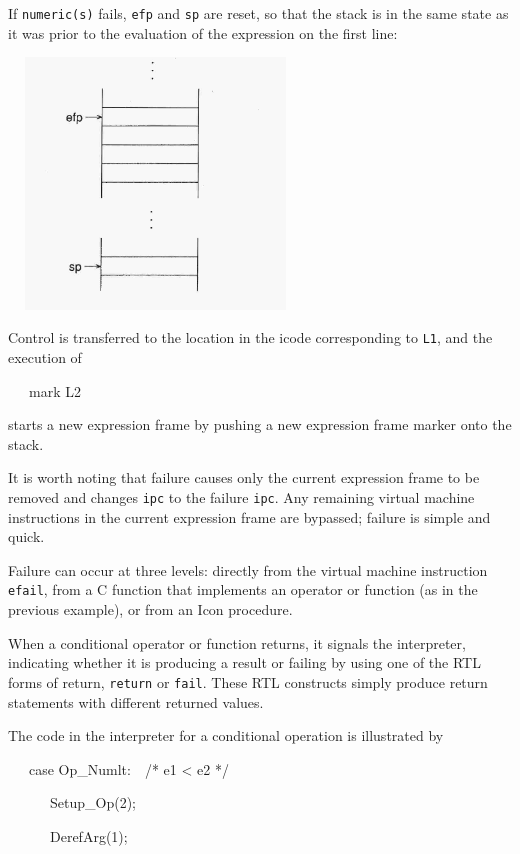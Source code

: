 If \texttt{numeric(s)} fails, \texttt{efp} and \texttt{sp} are reset,
so that the stack is in the same state as it was prior to the
evaluation of the expression on the first line:

\ \  \includegraphics[width=2.778in,height=2.6311in]{ib-img/ib-img065.jpg} 

Control is transferred to the location in the icode corresponding to
\texttt{L1}, and the execution of

{\ttfamily\mdseries
\ \ \ mark L2}

\noindent starts a new expression frame by pushing a new expression
frame marker onto the stack.

It is worth noting that failure causes only the current expression
frame to be removed and changes \texttt{ipc} to the failure
\texttt{ipc}. Any remaining virtual machine instructions in the
current expression frame are bypassed; failure is simple and quick.

Failure can occur at three levels: directly from the virtual machine
instruction \texttt{efail}, from a C function that implements an
operator or function (as in the previous example), or from an Icon
procedure.


When a conditional operator or function returns, it signals the
interpreter, indicating whether it is producing a result or failing by
using one of the RTL forms of return, \texttt{return} or
\texttt{fail}. These RTL constructs simply produce return statements
with different returned values.

The code in the interpreter for a conditional operation is illustrated by

{\ttfamily\mdseries
\ \ \ case Op\_Numlt:\ \ /* e1 {\textless} e2 */}

{\ttfamily\mdseries
\ \ \ \ \ \ Setup\_Op(2);}

{\ttfamily\mdseries
\ \ \ \ \ \ DerefArg(1);}

